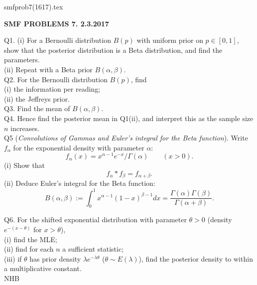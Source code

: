 \documentclass[12pt]{article}
\begin{document}
\def\ni{\noindent}
\def\i{\indent}
\def\a{\alpha}
\def\b{\beta}
\def\e{\epsilon}
\def\d{\delta}
\def\g{\gamma}
\def\qq{\qquad}
\def\q{\quad}
\def\L{\Lambda}
\def\C{\cal C}
\def\E{\cal E}
\def\G{\Gamma}
\def\F{\cal F}
\def\K{\cal K}
\def\O{\cal O}
\def\A{\cal A}
\def\B{\cal B}
\def\S{\cal S}
\def\N{\cal N}
\def\M{\cal M}
\def\P{\cal P}
\def\Om{\Omega}
\def\om{\omega}
\def\s{\sigma}
\def\t{\theta}
\def\z{\zeta}
\def\p{\phi}
\def\m{\mu}
\def\n{\nu}
\def\b{\beta}
\def\e{\epsilon}
\def\l{\lambda}
\def\Si{\Sigma}
\def\half{\frac{1}{2}}
\def\hb{\hfil \break}
\ni smfprob7(1617).tex \\
\begin{center}
{\bf SMF PROBLEMS 7.  2.3.2017} \\
\end{center}

\ni Q1. (i) For a Bernoulli distribution $B(p)$ with uniform prior on $p \in [0,1]$, show that the posterior distribution is a Beta distribution, and find the parameters. \\
(ii)  Repeat with a Beta prior $B(\a, \b)$. \\

\ni Q2. For the Bernoulli distribution $B(p)$, find \\
(i) the information per reading; \\
(ii) the Jeffreys prior. \\

\ni Q3.  Find the mean of $B(\a, \b)$. \\

\ni Q4.  Hence find the posterior mean in Q1(ii), and interpret this as the sample size $n$ increases. \\

\ni Q5 ({\it Convolutions of Gammas and Euler's integral for the Beta function}).  Write $f_{\a}$ for the exponential density with parameter ${\a}$:
$$
f_{\a}(x) = x^{\a - 1} e^{-x}/\G(\a) \qquad (x > 0).
$$
(i) Show that
$$f_{\a} \ast f_{\b} = f_{\a + \b}.
$$
(ii)  Deduce Euler's integral for the Beta function:
$$
B(\a, \b) := \int_0^1 x^{\a - 1} (1-x)^{\b - 1} dx = \frac{\G(\a) \G(\b)}{\G(\a + \b)}.
$$

\ni Q6.  For the shifted exponential distribution with parameter $\t > 0$ (density $e^{-(x-\t)}$ for $x > \t$), \\
(i) find the MLE; \\
(ii) find for each $n$ a sufficient statistic; \\
(iii) if $\t$ has prior density $\l e^{-\l \t}$ ($\t \sim E(\l)$), find the posterior density to within a multiplicative constant.\\

\hfil NHB \break
\end{document}
